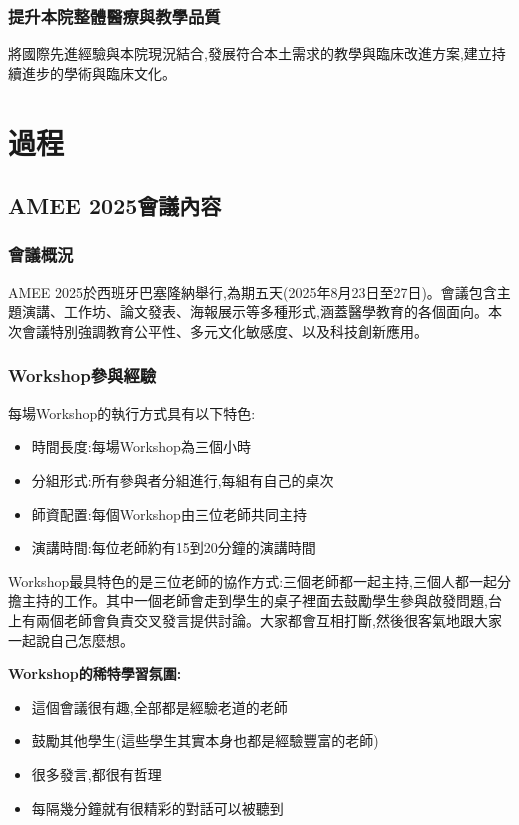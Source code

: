 \documentclass[12pt,a4paper]{article}
\begin{document}
\subsubsection{提升本院整體醫療與教學品質}

將國際先進經驗與本院現況結合,發展符合本土需求的教學與臨床改進方案,建立持續進步的學術與臨床文化。

\section{過程}

\subsection{AMEE 2025會議內容}

\subsubsection{會議概況}

AMEE 2025於西班牙巴塞隆納舉行,為期五天(2025年8月23日至27日)。會議包含主題演講、工作坊、論文發表、海報展示等多種形式,涵蓋醫學教育的各個面向。本次會議特別強調教育公平性、多元文化敏感度、以及科技創新應用。

\subsubsection{Workshop參與經驗}

每場Workshop的執行方式具有以下特色:
\begin{itemize}[nosep]
    \item 時間長度:每場Workshop為三個小時
    \item 分組形式:所有參與者分組進行,每組有自己的桌次
    \item 師資配置:每個Workshop由三位老師共同主持
    \item 演講時間:每位老師約有15到20分鐘的演講時間
\end{itemize}

Workshop最具特色的是三位老師的協作方式:三個老師都一起主持,三個人都一起分擔主持的工作。其中一個老師會走到學生的桌子裡面去鼓勵學生參與啟發問題,台上有兩個老師會負責交叉發言提供討論。大家都會互相打斷,然後很客氣地跟大家一起說自己怎麼想。

\begin{importantbox}
\textbf{Workshop的稀特學習氛圍:}
\begin{itemize}[nosep]
    \item 這個會議很有趣,全部都是經驗老道的老師
    \item 鼓勵其他學生(這些學生其實本身也都是經驗豐富的老師)
    \item 很多發言,都很有哲理
    \item 每隔幾分鐘就有很精彩的對話可以被聽到
\end{itemize}
\end{importantbox}
\end{document}
